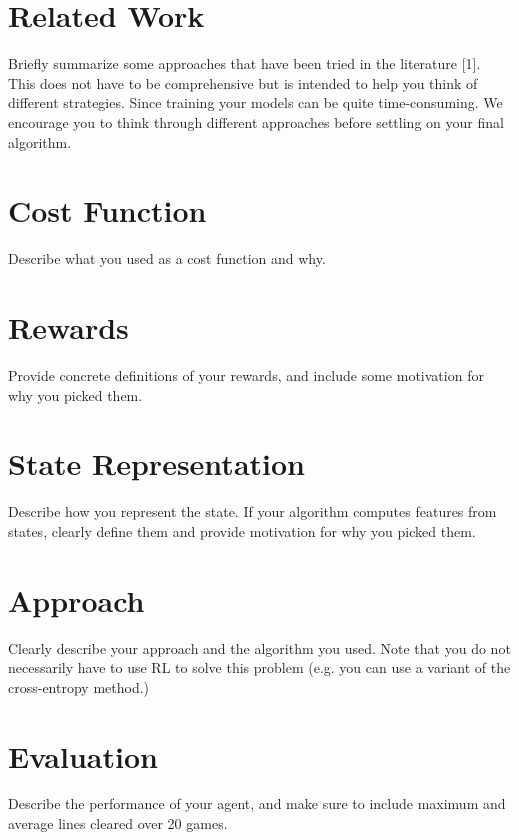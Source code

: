 \documentclass[12pt,letterpaper]{article}
\begin{document}
\section{Related Work}
Briefly summarize some approaches that have been tried in the literature [1]. This does not have to be comprehensive but is intended to help you think of different strategies. Since training your models can be quite time-consuming. We encourage you to think through different approaches before settling on your final algorithm.

\section{Cost Function}
Describe what you used as a cost function and why.

\section{Rewards}
Provide concrete definitions of your rewards, and include some motivation for why you picked them.

\section{State Representation}
Describe how you represent the state. If your algorithm computes features from states, clearly define them and provide motivation for why you picked them.  

\section{Approach}
Clearly describe your approach and the algorithm you used. Note that you do not necessarily have to use RL to solve this problem (e.g. you can use a variant of the cross-entropy method.)

\section{Evaluation}
Describe the performance of your agent, and make sure to include maximum and average lines cleared over 20 games.
\end{document}
